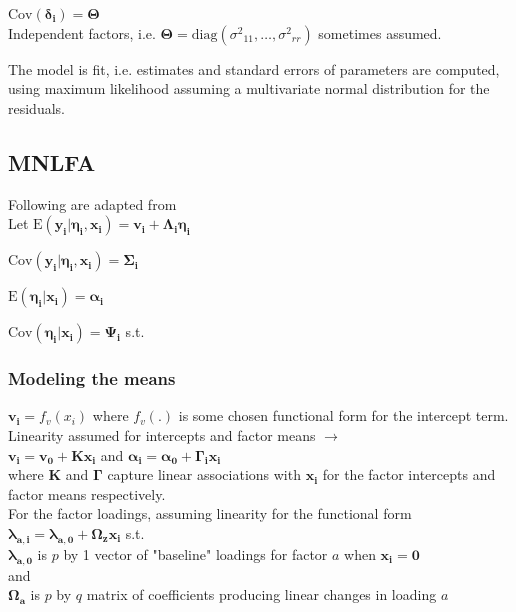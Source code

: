 \documentclass[12pt]{article}
\begin{document}
\noindent $\mbox{Cov}(\boldsymbol{\delta_i})=\boldsymbol{\Theta}$\\
\noindent Independent factors, i.e. $\boldsymbol{\Theta}=\mbox{diag}({\sigma^2}_{11}, \ldots, {\sigma^2}_{rr})$ sometimes assumed.

\noindent The model is fit, i.e. estimates and standard errors of parameters are computed, using maximum likelihood assuming a multivariate normal distribution for the residuals.
\subsection{MNLFA}
Following are adapted from \cite{bauer_2017}\\

\noindent Let $\mbox{E}(\boldsymbol{y_i}|\boldsymbol{\eta_i},\boldsymbol{x_i})=\boldsymbol{v_i}+\boldsymbol{\Lambda_i}\boldsymbol{\eta_i}$

\noindent $\mbox{Cov}(\boldsymbol{y_i}|\boldsymbol{\eta_i},\boldsymbol{x_i})=\boldsymbol{\Sigma_i}$

\noindent $\mbox{E}(\boldsymbol{\eta_i}|\boldsymbol{x_i})=\boldsymbol{\alpha_i}$

\noindent $\mbox{Cov}(\boldsymbol{\eta_i}|\boldsymbol{x_i})=\boldsymbol{\Psi_i}$ s.t.\\
\subsubsection{Modeling the means}
\noindent $\boldsymbol{v_i}=f_v(x_i)$ where $f_v(.)$ is some chosen functional form for the intercept term.\\

\noindent Linearity assumed for intercepts and factor means $\rightarrow$\\
\noindent $\boldsymbol{v_i}=\boldsymbol{v_0}+\boldsymbol{K}\boldsymbol{x_i}$ and $\boldsymbol{\alpha_i}=\boldsymbol{\alpha_0}+\boldsymbol{\Gamma_i}\boldsymbol{x_i}$\\

\noindent where $\boldsymbol{K}$ and $\boldsymbol{\Gamma}$ capture linear associations with $\boldsymbol{x_i}$ for the factor intercepts and factor means respectively.\\

\noindent For the factor loadings, assuming linearity for the functional form\\
\noindent $\boldsymbol{\lambda_{a,i}}=\boldsymbol{\lambda_{a,0}}+\boldsymbol{\Omega_z}\boldsymbol{x_i}$ s.t.\\
$\boldsymbol{\lambda_{a,0}}$ is $p$ by 1 vector of "baseline" loadings for factor $a$ when $\boldsymbol{x_i}=\boldsymbol{0}$\\
and\\
$\boldsymbol{\Omega_a}$ is $p$ by $q$ matrix of coefficients producing linear changes in loading $a$
\end{document}
